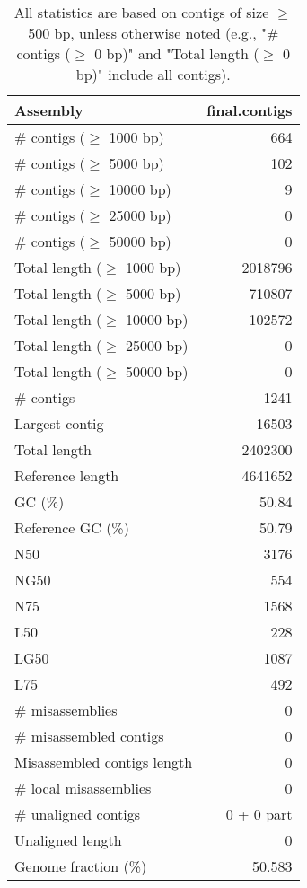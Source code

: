 \documentclass[12pt,a4paper]{article}
\begin{document}
\begin{table}[ht]
\begin{center}
\caption{All statistics are based on contigs of size $\geq$ 500 bp, unless otherwise noted (e.g., "\# contigs ($\geq$ 0 bp)" and "Total length ($\geq$ 0 bp)" include all contigs).}
\begin{tabular}{|l*{1}{|r}|}
\hline
Assembly & final.contigs \\ \hline
\# contigs ($\geq$ 1000 bp) & 664 \\ \hline
\# contigs ($\geq$ 5000 bp) & 102 \\ \hline
\# contigs ($\geq$ 10000 bp) & 9 \\ \hline
\# contigs ($\geq$ 25000 bp) & 0 \\ \hline
\# contigs ($\geq$ 50000 bp) & 0 \\ \hline
Total length ($\geq$ 1000 bp) & 2018796 \\ \hline
Total length ($\geq$ 5000 bp) & 710807 \\ \hline
Total length ($\geq$ 10000 bp) & 102572 \\ \hline
Total length ($\geq$ 25000 bp) & 0 \\ \hline
Total length ($\geq$ 50000 bp) & 0 \\ \hline
\# contigs & 1241 \\ \hline
Largest contig & 16503 \\ \hline
Total length & 2402300 \\ \hline
Reference length & 4641652 \\ \hline
GC (\%) & 50.84 \\ \hline
Reference GC (\%) & 50.79 \\ \hline
N50 & 3176 \\ \hline
NG50 & 554 \\ \hline
N75 & 1568 \\ \hline
L50 & 228 \\ \hline
LG50 & 1087 \\ \hline
L75 & 492 \\ \hline
\# misassemblies & 0 \\ \hline
\# misassembled contigs & 0 \\ \hline
Misassembled contigs length & 0 \\ \hline
\# local misassemblies & 0 \\ \hline
\# unaligned contigs & 0 + 0 part \\ \hline
Unaligned length & 0 \\ \hline
Genome fraction (\%) & 50.583 \\ \hline

\end{tabular}
\end{center}
\end{table}
\end{document}
